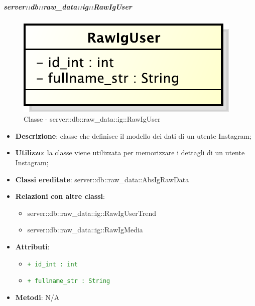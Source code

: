 		\subparagraph{server::db::raw\_data::ig::RawIgUser} %
		\label{subp:server_db_raw_data_ig_rawiguser}
			\begin{figure}[htbp]
				\centering
				\centerline{\includegraphics[scale=0.75]{./images/server/classes/db/raw_ig_user.pdf}}
				\caption{Classe - server::db::raw\_data::ig::RawIgUser}
			\end{figure}
			\begin{itemize}
				\item \textbf{Descrizione}: classe che definisce il modello dei dati di un utente Instagram;
				\item \textbf{Utilizzo}:  la classe viene utilizzata per memorizzare i dettagli di un utente Instagram;
				\item \textbf{Classi ereditate}: server::db::raw\_data::AbsIgRawData
				\item \textbf{Relazioni con altre classi}:
					\begin{itemize}
						\item server::db::raw\_data::ig::RawIgUserTrend
						\item server::db::raw\_data::ig::RawIgMedia
					\end{itemize}
				\item \textbf{Attributi}:
					\begin{itemize}
						\item \textcolor{forestgreen}{\texttt{+ id\_int : int}}
						\item \textcolor{forestgreen}{\texttt{+ fullname\_str : String}}
					\end{itemize}
				\item \textbf{Metodi}: N/A
			\end{itemize}


